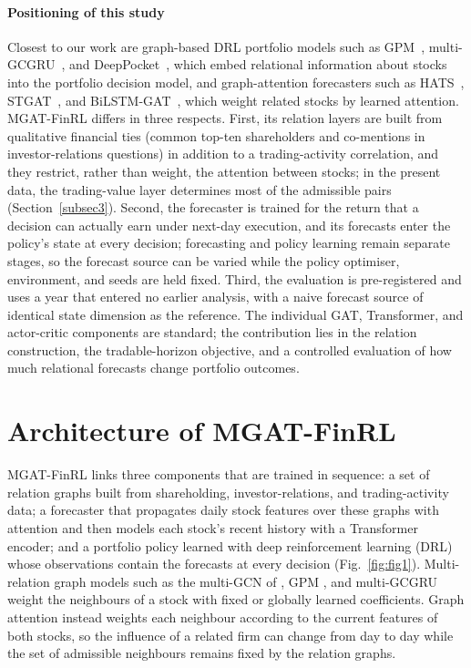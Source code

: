 \documentclass[pdflatex,sn-mathphys-num]{sn-jnl}%
\theoremstyle{thmstyleone}%
\theoremstyle{thmstyletwo}%
\theoremstyle{thmstylethree}%
\begin{document}
{\color{blue}\paragraph{Positioning of this study}
Closest to our work are graph-based DRL portfolio models such as GPM~\citep{Si2022GPM}, multi-GCGRU~\citep{Liu2021MultiGCGRU}, and DeepPocket~\citep{Farzan2021DeepPocket}, which embed relational information about stocks into the portfolio decision model, and graph-attention forecasters such as HATS~\citep{Kim2019HATS}, STGAT~\citep{Feng2025STGAT}, and BiLSTM-GAT~\citep{Lu2025BiLSTMGAT}, which weight related stocks by learned attention. MGAT-FinRL differs in three respects. First, its relation layers are built from qualitative financial ties (common top-ten shareholders and co-mentions in investor-relations questions) in addition to a trading-activity correlation, and they restrict, rather than weight, the attention between stocks; in the present data, the trading-value layer determines most of the admissible pairs (Section~\ref{subsec3}). Second, the forecaster is trained for the return that a decision can actually earn under next-day execution, and its forecasts enter the policy's state at every decision; forecasting and policy learning remain separate stages, so the forecast source can be varied while the policy optimiser, environment, and seeds are held fixed. Third, the evaluation is pre-registered and uses a year that entered no earlier analysis, with a naive forecast source of identical state dimension as the reference. The individual GAT, Transformer, and actor-critic components are standard; the contribution lies in the relation construction, the tradable-horizon objective, and a controlled evaluation of how much relational forecasts change portfolio outcomes.\par}

\section{Architecture of MGAT-FinRL}\label{sec3}

{\color{blue}MGAT-FinRL links three components that are trained in sequence: a set of relation graphs built from shareholding, investor-relations, and trading-activity data; a forecaster that propagates daily stock features over these graphs with attention and then models each stock's recent history with a Transformer encoder; and a portfolio policy learned with deep reinforcement learning (DRL) whose observations contain the forecasts at every decision (Fig.~\ref{fig:fig1}). Multi-relation graph models such as the multi-GCN of \citep{Ye2020MultiGraph}, GPM \citep{Si2022GPM}, and multi-GCGRU \citep{Liu2021MultiGCGRU} weight the neighbours of a stock with fixed or globally learned coefficients. Graph attention \citep{Velickovic2018GAT} instead weights each neighbour according to the current features of both stocks, so the influence of a related firm can change from day to day while the set of admissible neighbours remains fixed by the relation graphs.\par}
\end{document}
